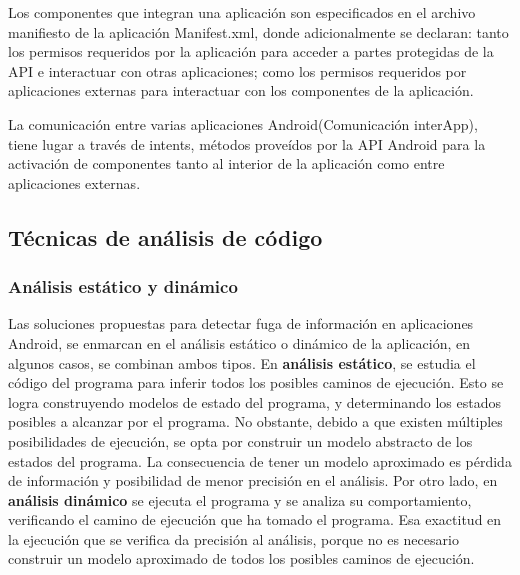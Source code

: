 Los componentes que integran una aplicación son especificados en el archivo
manifiesto de la aplicación Manifest.xml\cite{App-Manifest}, donde
adicionalmente se declaran: tanto los permisos requeridos por la aplicación para
acceder a partes protegidas de la API\cite{Android-Permissions} e interactuar
con otras aplicaciones; como los permisos requeridos por aplicaciones
externas para interactuar con los componentes de la aplicación.

La comunicación entre varias aplicaciones Android(Comunicación interApp), tiene
lugar a través de intents\cite{App-Intent}, métodos proveídos por la API Android
para la activación de componentes tanto al interior de la aplicación como entre
aplicaciones externas. 

\subsection{Técnicas de análisis de código}
\subsubsection{Análisis estático y dinámico}
Las soluciones propuestas para detectar fuga de información en aplicaciones
Android, se enmarcan en el análisis estático o dinámico de la aplicación, en
algunos casos, se combinan ambos tipos.\newline 
En \textbf{análisis estático}\cite{Static-dynamic}, se estudia el código del
programa para inferir todos los posibles caminos de ejecución. Esto se logra
construyendo modelos de estado del programa, y determinando los estados posibles
a alcanzar por el programa.
No obstante, debido a que existen múltiples posibilidades de ejecución, se opta
por construir un modelo abstracto de los estados del programa. La consecuencia
de tener un modelo aproximado es pérdida de información y posibilidad de menor
precisión en el análisis.\newline 
Por otro lado, en \textbf{análisis dinámico} se ejecuta el programa y se analiza
su comportamiento, verificando el camino de ejecución que ha tomado el programa.
Esa exactitud en la ejecución que se verifica da precisión al análisis, porque
no es necesario construir un modelo aproximado de todos los posibles caminos de
ejecución.

